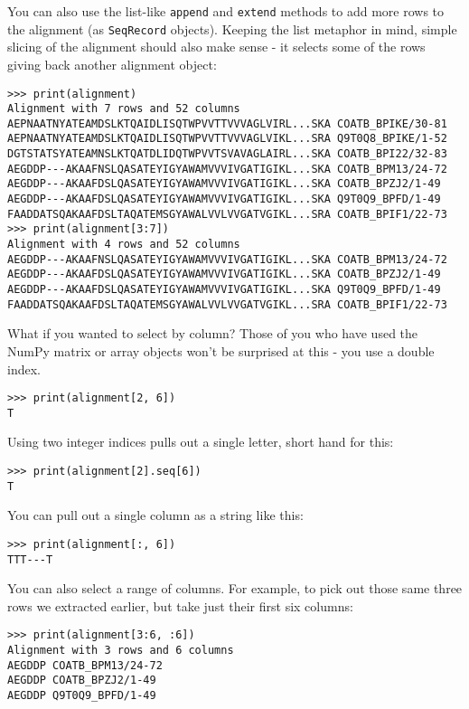 You can also use the list-like \verb|append| and \verb|extend| methods to add
more rows to the alignment (as \verb|SeqRecord| objects). Keeping the list
metaphor in mind, simple slicing of the alignment should also make sense -
it selects some of the rows giving back another alignment object:

\begin{verbatim}
>>> print(alignment)
Alignment with 7 rows and 52 columns
AEPNAATNYATEAMDSLKTQAIDLISQTWPVVTTVVVAGLVIRL...SKA COATB_BPIKE/30-81
AEPNAATNYATEAMDSLKTQAIDLISQTWPVVTTVVVAGLVIKL...SRA Q9T0Q8_BPIKE/1-52
DGTSTATSYATEAMNSLKTQATDLIDQTWPVVTSVAVAGLAIRL...SKA COATB_BPI22/32-83
AEGDDP---AKAAFNSLQASATEYIGYAWAMVVVIVGATIGIKL...SKA COATB_BPM13/24-72
AEGDDP---AKAAFDSLQASATEYIGYAWAMVVVIVGATIGIKL...SKA COATB_BPZJ2/1-49
AEGDDP---AKAAFDSLQASATEYIGYAWAMVVVIVGATIGIKL...SKA Q9T0Q9_BPFD/1-49
FAADDATSQAKAAFDSLTAQATEMSGYAWALVVLVVGATVGIKL...SRA COATB_BPIF1/22-73
>>> print(alignment[3:7])
Alignment with 4 rows and 52 columns
AEGDDP---AKAAFNSLQASATEYIGYAWAMVVVIVGATIGIKL...SKA COATB_BPM13/24-72
AEGDDP---AKAAFDSLQASATEYIGYAWAMVVVIVGATIGIKL...SKA COATB_BPZJ2/1-49
AEGDDP---AKAAFDSLQASATEYIGYAWAMVVVIVGATIGIKL...SKA Q9T0Q9_BPFD/1-49
FAADDATSQAKAAFDSLTAQATEMSGYAWALVVLVVGATVGIKL...SRA COATB_BPIF1/22-73
\end{verbatim}

What if you wanted to select by column? Those of you who have used the NumPy
matrix or array objects won't be surprised at this - you use a double index.

\begin{verbatim}
>>> print(alignment[2, 6])
T
\end{verbatim}

\noindent Using two integer indices pulls out a single letter, short hand for this:

\begin{verbatim}
>>> print(alignment[2].seq[6])
T
\end{verbatim}

You can pull out a single column as a string like this:

\begin{verbatim}
>>> print(alignment[:, 6])
TTT---T
\end{verbatim}

You can also select a range of columns. For example, to pick out those same
three rows we extracted earlier, but take just their first six columns:

\begin{verbatim}
>>> print(alignment[3:6, :6])
Alignment with 3 rows and 6 columns
AEGDDP COATB_BPM13/24-72
AEGDDP COATB_BPZJ2/1-49
AEGDDP Q9T0Q9_BPFD/1-49
\end{verbatim}

